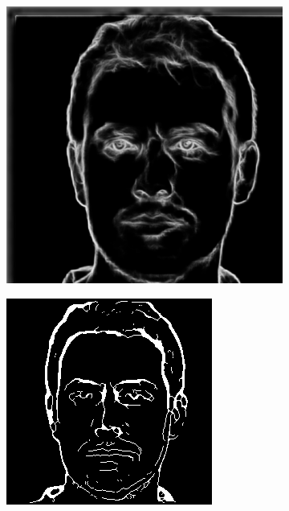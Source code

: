 \documentclass{70_styles/svproc}
\begin{document}
\begin{figure}
\begin{subfigure}[b]{0.2\textwidth}
     \end{subfigure}
     \begin{subfigure}[b]{0.2\textwidth}
         \centering
         \includegraphics[width=\textwidth]{70_figures/HED_seed0049.png}
     \end{subfigure}
     \begin{subfigure}[b]{0.2\textwidth}
         \centering
         \includegraphics[width=\textwidth]{70_figures/seed0049_EM.png}

\end{subfigure}
\end{figure}
\end{document}
